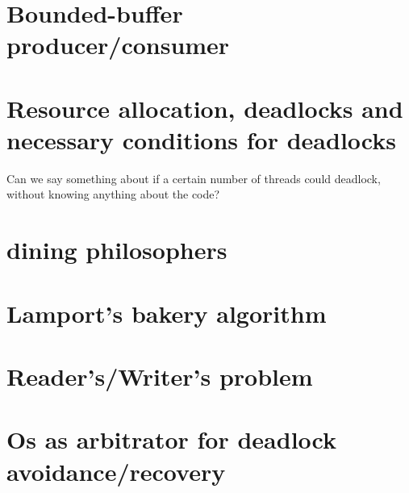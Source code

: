 \section{Bounded-buffer producer/consumer}

\section{Resource allocation, deadlocks and necessary conditions for deadlocks}
Can we say something about if a certain number of threads could deadlock, without knowing anything about the code?

\section{dining philosophers}
\section{Lamport's bakery algorithm}
\section{Reader's/Writer's problem}
\section{Os as arbitrator for deadlock avoidance/recovery}

\setcounter{chapter}{6}